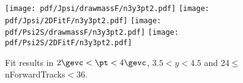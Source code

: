 \begin{figure}[H]
\begin{center}
\texttt{[image: pdf/Jpsi/drawmassF/n3y3pt2.pdf]}
\texttt{[image: pdf/Jpsi/2DFitF/n3y3pt2.pdf]}
\vspace*{-0.5cm}
\texttt{[image: pdf/Psi2S/drawmassF/n3y3pt2.pdf]}
\texttt{[image: pdf/Psi2S/2DFitF/n3y3pt2.pdf]}
\vspace*{-0.5cm}
\end{center}
\caption{Fit results in $2\gevc<\pt<4\gevc$, $3.5<y<4.5$ and 24$\leq$nForwardTracks$<$36.}
\label{Fitn3y3pt2}
\end{figure}
